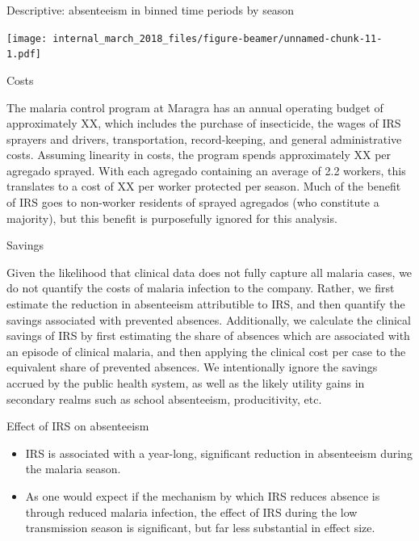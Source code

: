 \documentclass[ignorenonframetext,]{beamer}
\providecommand{\tightlist}{%
  \setlength{\itemsep}{0pt}\setlength{\parskip}{0pt}}
\begin{document}
\begin{frame}{Descriptive: absenteeism in binned time periods by season}

\texttt{[image: internal\_march\_2018\_files/figure-beamer/unnamed-chunk-11-1.pdf]}

\end{frame}

\begin{frame}{Costs}

The malaria control program at Maragra has an annual operating budget of
approximately XX, which includes the purchase of insecticide, the wages
of IRS sprayers and drivers, transportation, record-keeping, and general
administrative costs. Assuming linearity in costs, the program spends
approximately XX per agregado sprayed. With each agregado containing an
average of 2.2 workers, this translates to a cost of XX per worker
protected per season. Much of the benefit of IRS goes to non-worker
residents of sprayed agregados (who constitute a majority), but this
benefit is purposefully ignored for this analysis.

\end{frame}

\begin{frame}{Savings}

Given the likelihood that clinical data does not fully capture all
malaria cases, we do not quantify the costs of malaria infection to the
company. Rather, we first estimate the reduction in absenteeism
attributible to IRS, and then quantify the savings associated with
prevented absences. Additionally, we calculate the clinical savings of
IRS by first estimating the share of absences which are associated with
an episode of clinical malaria, and then applying the clinical cost per
case to the equivalent share of prevented absences. We intentionally
ignore the savings accrued by the public health system, as well as the
likely utility gains in secondary realms such as school absenteeism,
producitivity, etc.

\end{frame}

\begin{frame}{Effect of IRS on absenteeism}

\begin{itemize}
\tightlist
\item
  IRS is associated with a year-long, significant reduction in
  absenteeism during the malaria season.\\
\item
  As one would expect if the mechanism by which IRS reduces absence is
  through reduced malaria infection, the effect of IRS during the low
  transmission season is significant, but far less substantial in effect
  size.
\end{itemize}

\end{frame}
\end{document}
